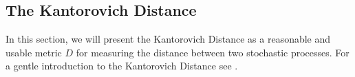 \begin{comment}
The most common way to think about stochastic processes is, however, in terms of its probability measure $\mathbb{P}$.
For the purpose of this discussion, let $\Omega=\mathbb{R}^n$ and $\zeta=id$.
Each of the elements of the stochastic process except for the probability measure is fixed, and the stochastic process is considered in terms of the space of probability measures.
This interpretation will be followed throughout this paper.

The choice of the space of probability measures as the underlying space for stochastic processes leads to much more difficulties when defining a metric.
It is not feasible to regard two probability measures $\mathbb{P}_1$ and $\mathbb{P}_2$ as integrable functions and elements of $L^p$ for two reasons:
\begin{enumerate}
\item The metric between two stochastic processes $\xi_1$ and $\xi_2$ would be defined in terms of the $L^p$-norm between their probability measures $\mathbb{P}_1$ and $\mathbb{P}_2$:
  \begin{equation}
    \label{eq:prob-measure-metric-as-Lpnorm}
    D(\mathbb{P}_1,\mathbb{P}_2) := \left\Vert \mathbb{P}_1-\mathbb{P}_2\right\Vert = \sum_{t=1}^T\int_{\omega\in\Omega}\left\Vert \mathbb{P}_{1,t}(\omega)-\mathbb{P}_{2,t}(\omega)\right\Vert
  \end{equation}
  This does, however, not yield meaningful results.
See figure \ref{fig:example-wrong-distance} for an example.
\item The definition of the above metric makes use of the point wise difference of $\mathbb{P}_1$ and $\mathbb{P}_2$
  This difference is, however, not a meaningful construction, since the difference of two probability measure functions is itself \textbf{never} a probability measure.
\end{enumerate}

\end{comment}
\subsection{The Kantorovich Distance}
\label{sec:kantoro}
In this section, we will present the Kantorovich Distance as a reasonable and usable metric $D$ for measuring the distance between two stochastic processes.
For a gentle introduction to the Kantorovich Distance see .

